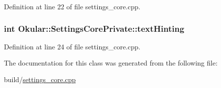 Definition at line 22 of file settings\+\_\+core.\+cpp.

\hypertarget{classOkular_1_1SettingsCorePrivate_a8492490de6581f4d098f56482f943c5e}{
\subsubsection[{text\+Hinting}]{\setlength{\rightskip}{0pt plus 5cm}int Okular\+::\+Settings\+Core\+Private\+::text\+Hinting}}\label{classOkular_1_1SettingsCorePrivate_a8492490de6581f4d098f56482f943c5e}


Definition at line 24 of file settings\+\_\+core.\+cpp.



The documentation for this class was generated from the following file\+:\begin{DoxyCompactItemize}
\item 
build/\hyperlink{settings__core_8cpp}{settings\+\_\+core.\+cpp}\end{DoxyCompactItemize}

